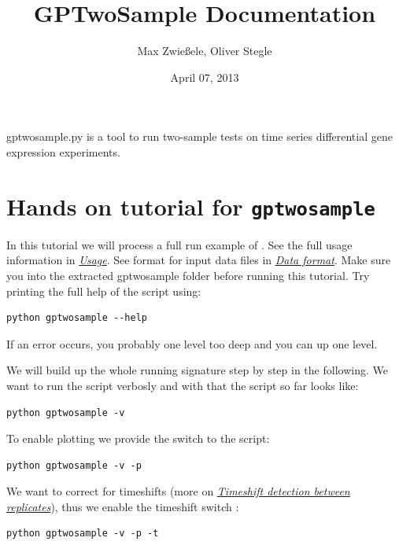 \documentclass[letterpaper,10pt,english]{sphinxmanual}
\title{GPTwoSample Documentation}
\date{April 07, 2013}
\author{Max Zwießele, Oliver Stegle}
\begin{document}
\maketitle
\tableofcontents
{}\label{index::doc}


gptwosample.py is a tool to run two-sample tests on time series
differential gene expression experiments.


\chapter{Hands on tutorial for \texttt{gptwosample}}
\label{tutorial::doc}\label{tutorial:welcome-to-gptwosample}\label{tutorial:hands-on-tutorial-for-gptwosample}
In this tutorial we will process a full run example of
. See the full usage information in {\hyperref[usage:usage]{\emph{Usage}}}. See
format for input data  files in {\hyperref[usage:dataformat]{\emph{Data format}}}. Make sure
you  into the extracted gptwosample folder before running this tutorial.
Try printing the full help of the script using:

\begin{Verbatim}[commandchars=\\\{\}]
python gptwosample --help
\end{Verbatim}

If an error occurs, you probably  one level too deep and you can
 up one level.

We will build up the whole running signature step by step in the following.
We want to run the script verbosly and with that the script so far looks like:

\begin{Verbatim}[commandchars=\\\{\}]
python gptwosample -v
\end{Verbatim}

To enable plotting we provide the switch  to the script:

\begin{Verbatim}[commandchars=\\\{\}]
python gptwosample -v -p
\end{Verbatim}

We want to correct for timeshifts (more on {\hyperref[timeshift:timeshift]{\emph{Timeshift detection between replicates}}}), thus we
enable the timeshift switch :

\begin{Verbatim}[commandchars=\\\{\}]
python gptwosample -v -p -t
\end{Verbatim}
\end{document}

